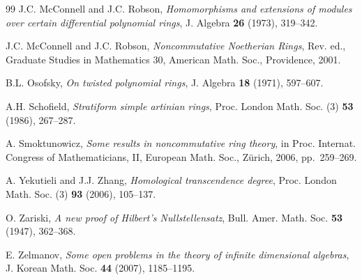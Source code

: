 \documentclass{conm-p-l}
\theoremstyle{definition}
\theoremstyle{remark}
\numberwithin{equation}{section}
\begin{document}
\begin{thebibliography}{99}
 J.C. McConnell and J.C. Robson,
   \emph{Homomorphisms and extensions of modules over certain differential polynomial rings}, J. Algebra \textbf{26} (1973), 319--342.

  J.C. McConnell and J.C. Robson,
   \emph{Noncommutative Noetherian Rings}, Rev. ed., Graduate Studies in
   Mathematics 30, American Math. Soc., Providence, 2001.

 B.L. Osofsky, \emph{On twisted polynomial rings}, J. Algebra \textbf{18} (1971), 597--607.

  A.H. Schofield, \emph{Stratiform simple artinian rings}, Proc. London Math. Soc. (3) \textbf{53} (1986), 267--287.

 A. Smoktunowicz, \emph{
Some results in noncommutative ring theory}, in Proc. Internat. Congress of Mathematicians, II, European Math. Soc., Z\"urich, 2006, pp.~259--269.

 A. Yekutieli and J.J. Zhang, \emph{Homological transcendence degree}, Proc. London Math. Soc. (3) \textbf{93} (2006), 105--137.

 O. Zariski, \emph{A new proof of Hilbert's Nullstellensatz}, Bull. Amer. Math. Soc. \textbf{53} (1947), 362--368.

 E. Zelmanov, \emph{Some open problems in the theory of infinite dimensional algebras}, J. Korean Math. Soc. \textbf{44} (2007), 1185--1195.
\end{thebibliography}
\end{document}
